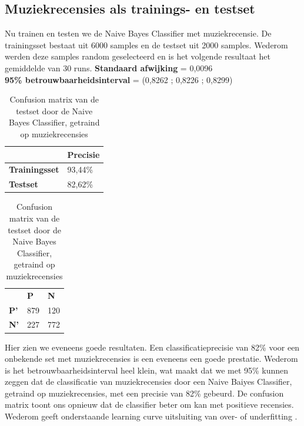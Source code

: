\subsection{Muziekrecensies als trainings- en testset}\label{Muziek als trainings- en testset}

Nu trainen en testen we de Naive Bayes Classifier met muziekrecensie. De trainingsset bestaat uit 6000 samples en de testset uit 2000 samples. Wederom werden deze samples random geselecteerd en is het volgende resultaat het gemiddelde van 30 runs.
\newline
\textbf{Standaard afwijking} = 0,0096\\
\textbf{95\% betrouwbaarheidsinterval} = (0,8262 ; 0,8226 ; 0,8299)\\
 
\begin{table}[h]
\centering
\setlength\tabcolsep{4pt}
\begin{minipage}{0.48\textwidth}
\centering
\begin{tabular}{l|l|}
\cline{2-2}
                                            & \textbf{Precisie} \\ \hline
\multicolumn{1}{|l|}{\textbf{Trainingsset}} & 93,44\%           \\ \hline
\multicolumn{1}{|l|}{\textbf{Testset}}      & 82,62\%           \\ \hline
\end{tabular}
\caption{Classificatieprecisie Naive Bayes Classifier, getraind op muziekrecensies}
\end{minipage}%
\hfill
\begin{minipage}{0.48\textwidth}
\centering
\begin{tabular}{lll}
                                 & \textbf{P}               & \textbf{N}               \\ \cline{2-3} 
\multicolumn{1}{l|}{\textbf{P'}} & \multicolumn{1}{l|}{879} & \multicolumn{1}{l|}{120} \\ \cline{2-3} 
\multicolumn{1}{l|}{\textbf{N'}} & \multicolumn{1}{l|}{227} & \multicolumn{1}{l|}{772} \\ \cline{2-3} 
\end{tabular}
\caption{Confusion matrix van de testset door de  Naive Bayes Classifier, getraind op muziekrecensies} 
\end{minipage}
\end{table}

Hier zien we eveneens goede resultaten. Een classificatieprecisie van 82\% voor een onbekende set met muziekrecensies is een eveneens een goede prestatie. Wederom is het betrouwbaarheidsinterval heel klein, wat maakt dat we met 95\% kunnen zeggen dat de classificatie van muziekrecensies door een Naive Baiyes Classifier, getraind op muziekrecensies, met een precisie van 82\% gebeurd. De confusion matrix toont ons opnieuw dat de classifier beter om kan met positieve recensies.
%
Wederom geeft onderstaande learning curve uitsluiting van over- of underfitting .

